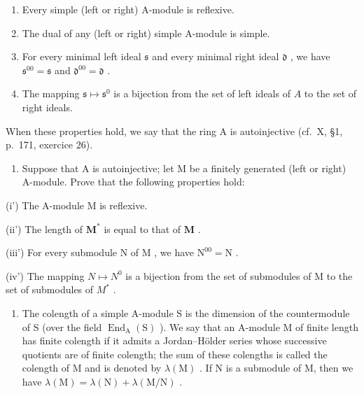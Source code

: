 \begin{enumerate}
\def\labelenumi{(\roman{enumi})}
\item
  Every simple (left or right) A-module is reflexive.
\item
  The dual of any (left or right) simple A-module is simple.
\item
  For every minimal left ideal \(\mathfrak{s}\) and every minimal right ideal \(\mathfrak{d}\) , we have \(\mathfrak{s}^{00} = \mathfrak{s}\) and \(\mathfrak{d}^{00} = \mathfrak{d}\) .
\item
  The mapping \(\mathfrak{s} \mapsto \mathfrak{s}^0\) is a bijection from the set of left ideals of \(A\) to the set of right ideals.
\end{enumerate}

When these properties hold, we say that the ring A is autoinjective (cf.~X, §1, p.~171, exercice 26).

\begin{enumerate}
\def\labelenumi{\alph{enumi})}
\tightlist
\item
  Suppose that A is autoinjective; let M be a finitely generated (left or right) A-module. Prove that the following properties hold:
\end{enumerate}

(i') The A-module M is reflexive.

(ii') The length of \(\mathbf{M}^*\) is equal to that of \(\mathbf{M}\) .

(iii') For every submodule \(\mathrm{N}\) of \(\mathrm{M}\) , we have \(\mathrm{N}^{00} = \mathrm{N}\) .

(iv') The mapping \(N \mapsto N^{0}\) is a bijection from the set of submodules of M to the set of submodules of \(M^{*}\) .

\begin{enumerate}
\def\labelenumi{\arabic{enumi})}
\setcounter{enumi}{8}
\tightlist
\item
  The colength of a simple A-module S is the dimension of the countermodule of S (over the field \(\operatorname{End}_{\mathrm{A}}(\mathrm{S})\) ). We say that an A-module M of finite length has finite colength if it admits a Jordan--Hölder series whose successive quotients are of finite colength; the sum of these colengths is called the colength of M and is denoted by \(\lambda(\mathrm{M})\) . If N is a submodule of M, then we have \(\lambda(\mathrm{M}) = \lambda(\mathrm{N}) + \lambda(\mathrm{M}/\mathrm{N})\) .
\end{enumerate}


